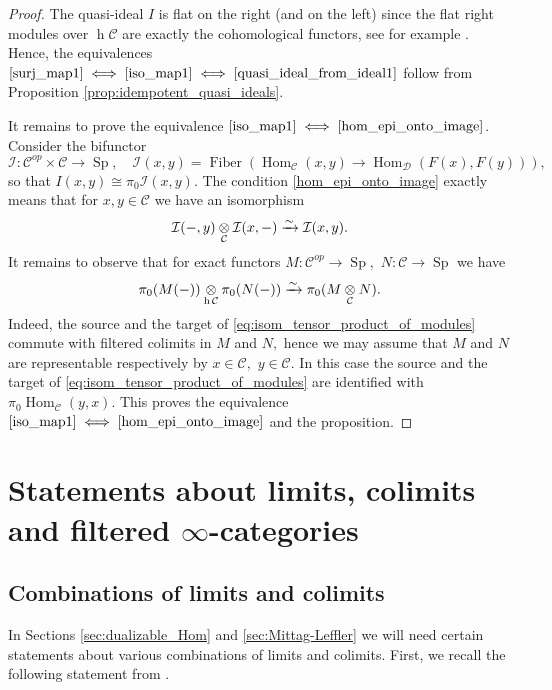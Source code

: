\documentclass[11pt,leqno]{amsart}
\newcommand{\Iff}[2]{$\text{\ref{#1}}\iff\text{\ref{#2}}$}
\newcommand{\Ifff}[3]{$\text{\ref{#1}}\iff\text{\ref{#2}}\iff\text{\ref{#3}}$}
\numberwithin{equation}{section}
\def\h{\operatorname{h}}
\def\Hom{\operatorname{Hom}}
\newcommand{\tens}[1]{%
  \mathbin{\mathop{\otimes}\displaylimits_{#1}}%
}
\newcommand{\xto}{\xrightarrow}
\newcommand{\Fiber}{\operatorname{Fiber}}
\newcommand{\cD}{{\mathcal D}}
\newcommand{\cI}{{\mathcal I}}
\newcommand{\cC}{{\mathcal C}}
\newcommand{\Sp}{\operatorname{Sp}}
\begin{document}
\begin{proof}The quasi-ideal $I$ is flat on the right (and on the left) since the flat right modules over $\h\cC$ are exactly the cohomological functors, see for example \cite[Proposition E.5]{E24}. Hence, the equivalences \Ifff{surj_map1}{iso_map1}{quasi_ideal_from_ideal1} follow from Proposition \ref{prop:idempotent_quasi_ideals}.

It remains to prove the equivalence \Iff{iso_map1}{hom_epi_onto_image}. Consider the bifunctor
\begin{equation*}
\cI:\cC^{op}\times\cC\to\Sp,\quad \cI(x,y)=\Fiber(\Hom_{\cC}(x,y)\to\Hom_{\cD}(F(x),F(y))),
\end{equation*}
so that $I(x,y)\cong \pi_0\cI(x,y).$ The condition \ref{hom_epi_onto_image} exactly means that for $x,y\in\cC$ we have an isomorphism
\begin{equation*}
\cI(-,y)\tens{\cC}\cI(x,-)\xto{\sim} \cI(x,y).
\end{equation*} 
It remains to observe that for exact functors $M:\cC^{op}\to\Sp,$ $N:\cC\to\Sp$ we have
\begin{equation}\label{eq:isom_tensor_product_of_modules}
\pi_0(M(-))\tens{\h\cC}\pi_0(N(-))\xto{\sim}\pi_0(M\tens{\cC}N).
\end{equation}
Indeed, the source and the target of \eqref{eq:isom_tensor_product_of_modules} commute with filtered colimits in $M$ and $N,$ hence we may assume that $M$ and $N$ are representable respectively by $x\in\cC,$ $y\in\cC.$ In this case the source and the target of \eqref{eq:isom_tensor_product_of_modules} are identified with $\pi_0\Hom_{\cC}(y,x).$ This proves the equivalence \Iff{iso_map1}{hom_epi_onto_image} and the proposition.
\end{proof}

\section{Statements about limits, colimits and filtered $\infty$-categories}
\label{sec:lim_colim_and_filtered}

\subsection{Combinations of limits and colimits}
In Sections \ref{sec:dualizable_Hom} and \ref{sec:Mittag-Leffler} we will need certain statements about various combinations of limits and colimits. First, we recall the following statement from \cite{E24}.
\end{document}
